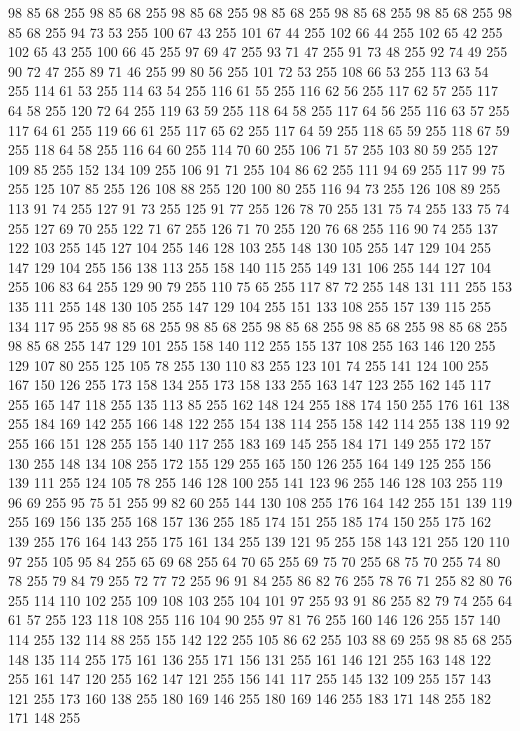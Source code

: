 98 85 68 255 98 85 68 255 98 85 68 255 98 85 68 255 98 85 68 255 98 85 68 255 98 85 68 255 94 73 53 255 100 67 43 255 101 67 44 255 102 66 44 255 102 65 42 255 102 65 43 255 100 66 45 255 97 69 47 255 93 71 47 255 91 73 48 255 92 74 49 255 90 72 47 255 89 71 46 255 99 80 56 255 101 72 53 255 108 66 53 255 113 63 54 255 114 61 53 255 114 63 54 255 116 61 55 255 116 62 56 255 117 62 57 255 117 64 58 255 120 72 64 255 119 63 59 255 118 64 58 255 117 64 56 255 116 63 57 255 117 64 61 255 119 66 61 255 117 65 62 255 117 64 59 255 118 65 59 255 118 67 59 255 118 64 58 255 116 64 60 255 114 70 60 255 106 71 57 255 103 80 59 255 127 109 85 255 152 134 109 255 106 91 71 255 104 86 62 255 111 94 69 255 117 99 75 255 125 107 85 255 126 108 88 255 120 100 80 255 116 94 73 255 126 108 89 255 113 91 74 255 127 91 73 255 125 91 77 255 126 78 70 255 131 75 74 255 133 75 74 255 127 69 70 255
122 71 67 255 126 71 70 255 120 76 68 255 116 90 74 255 137 122 103 255 145 127 104 255 146 128 103 255 148 130 105 255 147 129 104 255 147 129 104 255 156 138 113 255 158 140 115 255 149 131 106 255 144 127 104 255 106 83 64 255 129 90 79 255 110 75 65 255 117 87 72 255 148 131 111 255 153 135 111 255 148 130 105 255 147 129 104 255 151 133 108 255 157 139 115 255 134 117 95 255 98 85 68 255 98 85 68 255 98 85 68 255 98 85 68 255 98 85 68 255 98 85 68 255 147 129 101 255 158 140 112 255 155 137 108 255 163 146 120 255 129 107 80 255 125 105 78 255 130 110 83 255 123 101 74 255 141 124 100 255 167 150 126 255 173 158 134 255 173 158 133 255 163 147 123 255 162 145 117 255 165 147 118 255 135 113 85 255 162 148 124 255 188 174 150 255 176 161 138 255 184 169 142 255 166 148 122 255 154 138 114 255 158 142 114 255 138 119 92 255 166 151 128 255 155 140 117 255 183 169 145 255 184 171 149 255 172 157 130 255 148 134 108 255 172 155 129 255 165 150 126 255 164 149 125 255
156 139 111 255 124 105 78 255 146 128 100 255 141 123 96 255 146 128 103 255 119 96 69 255 95 75 51 255 99 82 60 255 144 130 108 255 176 164 142 255 151 139 119 255 169 156 135 255 168 157 136 255 185 174 151 255 185 174 150 255 175 162 139 255 176 164 143 255 175 161 134 255 139 121 95 255 158 143 121 255 120 110 97 255 105 95 84 255 65 69 68 255 64 70 65 255 69 75 70 255 68 75 70 255 74 80 78 255 79 84 79 255 72 77 72 255 96 91 84 255 86 82 76 255 78 76 71 255 82 80 76 255 114 110 102 255 109 108 103 255 104 101 97 255 93 91 86 255 82 79 74 255 64 61 57 255 123 118 108 255 116 104 90 255 97 81 76 255 160 146 126 255 157 140 114 255 132 114 88 255 155 142 122 255 105 86 62 255 103 88 69 255 98 85 68 255 148 135 114 255 175 161 136 255 171 156 131 255 161 146 121 255 163 148 122 255 161 147 120 255 162 147 121 255 156 141 117 255 145 132 109 255 157 143 121 255 173 160 138 255 180 169 146 255 180 169 146 255 183 171 148 255 182 171 148 255
